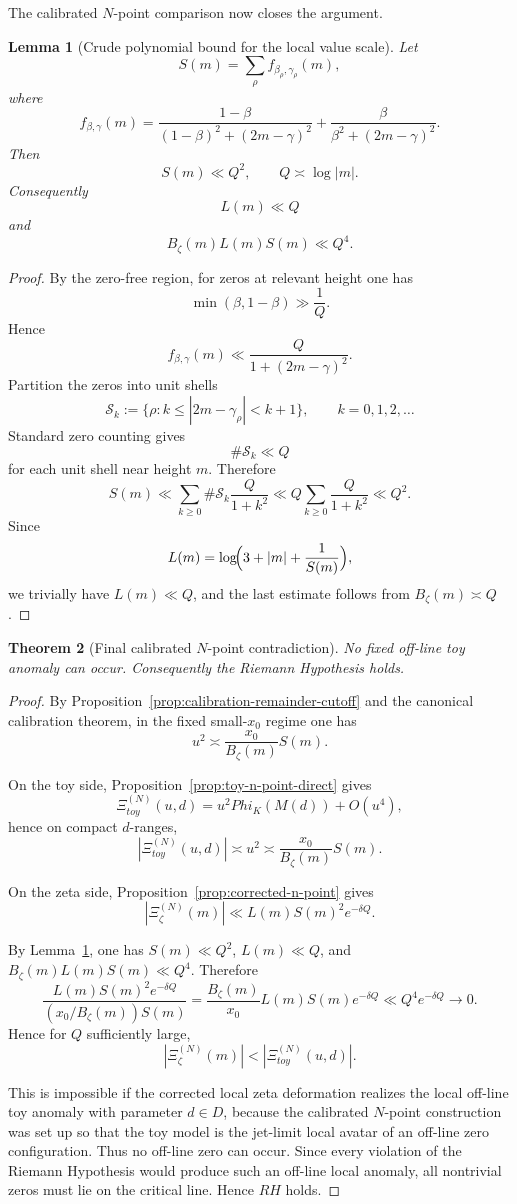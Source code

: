 \documentclass[11pt,a4paper]{amsart}
\def\Phi{Phi}%
\def\RH{RH}%
\def\toy{toy}%
\theoremstyle{plain}
\newtheorem{theorem}{Theorem}[section]
\newtheorem{lemma}[theorem]{Lemma}
\theoremstyle{definition}
\newcommand{\RH}{\mathrm{RH}}
\newcommand{\toy}{\mathrm{toy}}
\begin{document}
The calibrated $N$-point comparison now closes the argument.

\begin{lemma}[Crude polynomial bound for the local value scale]
\label{lem:crude-S-bound}
Let
\[
S(m)=\sum_\rho f_{\beta_\rho,\gamma_\rho}(m),
\]
where
\[
f_{\beta,\gamma}(m)
=
\frac{1-\beta}{(1-\beta)^2+(2m-\gamma)^2}
+
\frac{\beta}{\beta^2+(2m-\gamma)^2}.
\]
Then
\[
S(m)\ll Q^2,
\qquad Q\asymp \log|m|.
\]
Consequently
\[
L(m)\ll Q
\]
and
\[
B_\zeta(m)L(m)S(m)\ll Q^4.
\]
\end{lemma}

\begin{proof}
By the zero-free region, for zeros at relevant height one has
\[
\min(\beta,1-\beta)\gg \frac1Q.
\]
Hence
\[
f_{\beta,\gamma}(m)\ll \frac{Q}{1+(2m-\gamma)^2}.
\]
Partition the zeros into unit shells
\[
\mathcal S_k:=\{\rho: k\le |2m-\gamma_\rho|<k+1\},
\qquad k=0,1,2,\dots
\]
Standard zero counting gives
\[
\#\mathcal S_k\ll Q
\]
for each unit shell near height $m$. Therefore
\[
S(m)
\ll
\sum_{k\ge 0}\#\mathcal S_k\frac{Q}{1+k^2}
\ll
Q\sum_{k\ge 0}\frac{Q}{1+k^2}
\ll
Q^2.
\]
Since
\[
L(m)=\log\!\Bigl(3+|m|+\frac1{S(m)}\Bigr),
\]
we trivially have $L(m)\ll Q$, and the last estimate follows from
$B_\zeta(m)\asymp Q$.
\end{proof}

\begin{theorem}[Final calibrated $N$-point contradiction]
\label{thm:final-contradiction}
No fixed off-line toy anomaly can occur. Consequently the Riemann Hypothesis
holds.
\end{theorem}

\begin{proof}
By Proposition~\ref{prop:calibration-remainder-cutoff} and the canonical
calibration theorem, in the fixed small-$x_0$ regime one has
\[
u^2\asymp \frac{x_0}{B_\zeta(m)}S(m).
\]

On the toy side, Proposition~\ref{prop:toy-n-point-direct} gives
\[
\Xi_{\toy}^{(N)}(u,d)=u^2\Phi_K(M(d))+O(u^4),
\]
hence on compact $d$-ranges,
\[
|\Xi_{\toy}^{(N)}(u,d)|\asymp u^2
\asymp
\frac{x_0}{B_\zeta(m)}S(m).
\]

On the zeta side, Proposition~\ref{prop:corrected-n-point} gives
\[
|\Xi_\zeta^{(N)}(m)|\ll L(m)S(m)^2e^{-\delta Q}.
\]

By Lemma~\ref{lem:crude-S-bound}, one has $S(m)\ll Q^2$, $L(m)\ll Q$, and
$B_\zeta(m)L(m)S(m)\ll Q^4$. Therefore
\[
\frac{L(m)S(m)^2e^{-\delta Q}}{(x_0/B_\zeta(m))S(m)}
=
\frac{B_\zeta(m)}{x_0}L(m)S(m)e^{-\delta Q}
\ll
Q^4e^{-\delta Q}\to 0.
\]
Hence for $Q$ sufficiently large,
\[
|\Xi_\zeta^{(N)}(m)|<|\Xi_{\toy}^{(N)}(u,d)|.
\]

This is impossible if the corrected local zeta deformation realizes the local
off-line toy anomaly with parameter $d\in D$, because the calibrated $N$-point
construction was set up so that the toy model is the jet-limit local avatar of
an off-line zero configuration. Thus no off-line zero can occur. Since every
violation of the Riemann Hypothesis would produce such an off-line local
anomaly, all nontrivial zeros must lie on the critical line. Hence $\RH$
holds.
\end{proof}
\end{document}

